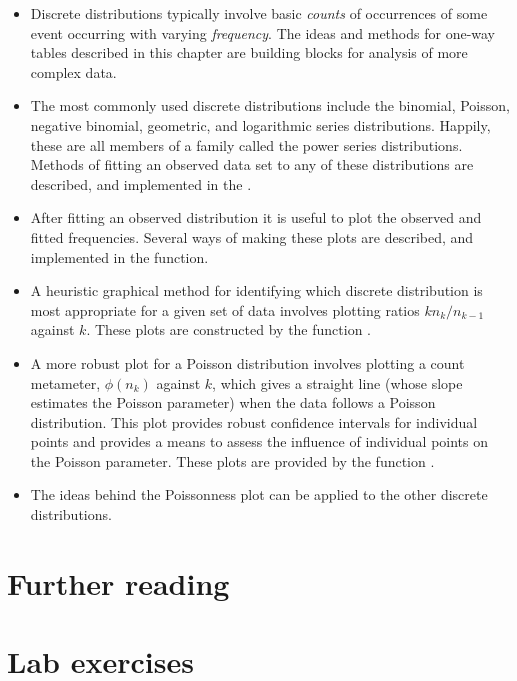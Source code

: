 \documentclass[11pt]{book}\usepackage[]{graphicx}\usepackage[]{color}
\begin{document}
\begin{itemize}
\item Discrete distributions typically involve basic \emph{counts} of occurrences
of some event occurring with varying \emph{frequency}. The ideas and methods
for one-way tables described in this chapter are building blocks for analysis
of more complex data.

\item The most commonly used discrete distributions include the binomial,
Poisson, negative binomial, geometric, and logarithmic series distributions.
Happily, these are all members of a family called the
power series distributions.
Methods of fitting an observed data set to any of these distributions are
described, and implemented in the .

\item After fitting an observed distribution it is useful to plot the observed
and fitted frequencies.
Several ways of making these plots are described, and implemented in the
 function.

\item A heuristic graphical method for identifying which discrete distribution is most
appropriate for a given set of data involves plotting ratios
$k n_k / n_{k-1}$ against $k$.
These plots are constructed by the function .

\item A more robust plot for a Poisson distribution involves plotting
a count metameter, $\phi ( n_k ) $ against $k$, which
gives a straight line (whose slope estimates the Poisson parameter)
when the data follows a Poisson distribution.
This plot provides robust confidence intervals for individual points
and provides a means to assess the influence of individual points
on the Poisson parameter.
These plots are provided by the function .

\item The ideas behind the Poissonness plot can be applied to the other
discrete distributions.
\end{itemize}


\section{Further reading}\label{sec:ch03-reading}

\section{Lab exercises}\label{sec:ch03-labs}
\end{document}
